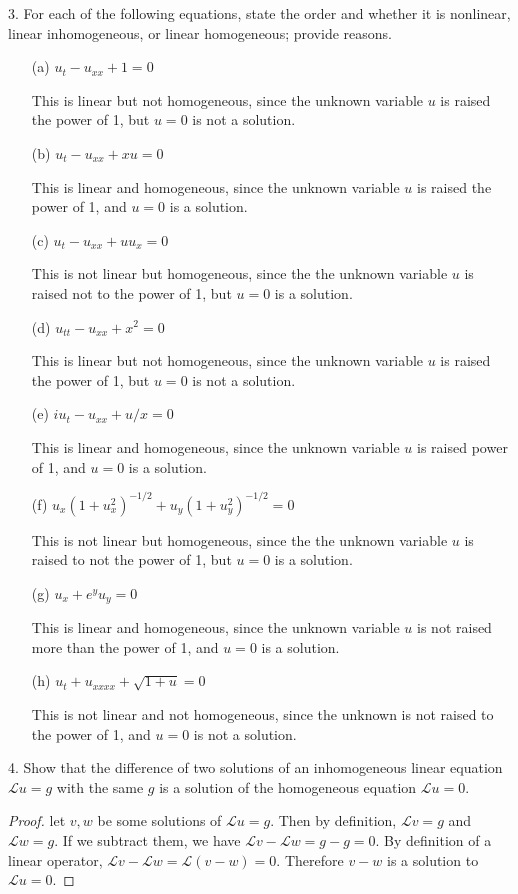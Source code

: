\documentclass[12pt]{article}
\newcommand{\paren}[1]{\left( #1 \right)}
\begin{document}
3. For each of the following equations, state the order and whether it is nonlinear, linear inhomogeneous, or linear homogeneous; provide reasons.
\begin{itemize}
    \item[(a)] $u_t - u_{xx} + 1 = 0$

    This is linear but not homogeneous, since the unknown variable $u$ is raised the power of 1, but $u=0$ is not a solution.
    \item[(b)] $u_t - u_{xx} + xu = 0$

    This is linear and homogeneous, since the unknown variable $u$ is raised the power of 1, and $u=0$ is a solution.
    \item[(c)] $u_t - u_{xx} + uu_x = 0$

    This is not linear but homogeneous, since the the unknown variable $u$ is raised not to the power of 1, but $u=0$ is a solution.
    \item[(d)] $u_{tt} - u_{xx} + x^2 = 0$

    This is linear but not homogeneous, since the unknown variable $u$ is raised the power of 1, but $u=0$ is not a solution.
    \item[(e)] $iu_t - u_{xx} + u/x = 0$

    This is linear and homogeneous, since the unknown variable $u$ is raised  power of 1, and $u=0$ is a solution.
    \item[(f)] $u_x \left(1 + u_x^2\right)^{-1/2} + u_y \left(1 + u_y^2\right)^{-1/2} = 0$

    This is not linear but homogeneous, since the the unknown variable $u$ is raised to not the power of 1, but $u=0$ is a solution.
    \item[(g)] $u_x + e^y u_y = 0$

    This is linear and homogeneous, since the unknown variable $u$ is not raised more than the power of 1, and $u=0$ is a solution.
    \item[(h)] $u_t + u_{xxxx} + \sqrt{1 + u} = 0$

    This is not linear and not homogeneous, since the unknown is not raised to the power of 1, and $u=0$ is not a solution. 
\end{itemize}

4. Show that the difference of two solutions of an inhomogeneous linear equation $\mathcal{L} u = g$ with the same $g$ is a solution of the homogeneous equation $\mathcal{L} u = 0$.
\begin{proof}
    let $v,w$ be some solutions of $\mathcal{L} u = g$. Then by definition, $\mathcal{L} v = g$ and $\mathcal{L} w = g$. If we subtract them, we have $\mathcal{L} v - \mathcal{L} w = g - g = 0$. By definition of a linear operator, $\mathcal{L} v - \mathcal{L} w = \mathcal{L}\paren{v-w}=0$. Therefore $v-w$ is a solution to $\mathcal{L} u = 0$.
\end{proof}
\end{document}
